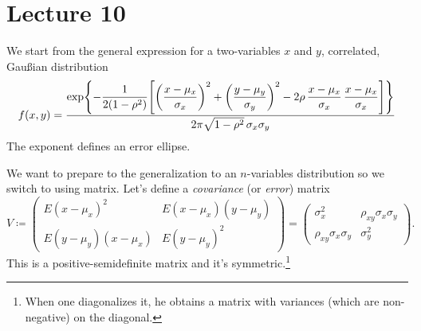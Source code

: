 
\chapter{Lecture 10}

We start from the general expression for a two-variables $x$ and $y$, correlated, Gau\ss{}ian distribution
\begin{equation}
  f(x,y) = \frac{%
	\displaystyle%
	\exp\curlyBrackets*{%
	  -\frac{1}{2(1-\rho^2)}
	  \squareBrackets*{%
		\left(\frac{x-\mu_x}{\sigma_x}\right)^2+
		\left(\frac{y-\mu_y}{\sigma_y}\right)^2
		-2\rho\,\frac{x-\mu_x}{\sigma_x}\,\frac{x-\mu_x}{\sigma_x}
	  }
	}
  }{2\pi\sqrt{1-\rho^2}\,\sigma_x\sigma_y}
\end{equation}
The exponent defines an error ellipse.


We want to prepare to the generalization to an $n$-variables distribution so we switch to using matrix.
Let's define a \emph{covariance} (or \emph{error}) matrix
\begin{equation}
	V\coloneqq 
	\begin{pmatrix}
		E(x-\mu_x)^2	&E(x-\mu_x)(y-\mu_y)\\
		E(y-\mu_y)(x-\mu_x) & E(y-\mu_y)^2
	\end{pmatrix}
	=
	\begin{pmatrix}
		\sigma_x^2	&\rho_{xy}\sigma_x\sigma_y\\
		\rho_{xy}\sigma_x\sigma_y &\sigma_y^2
	\end{pmatrix}.
\end{equation}
This is a positive-semidefinite matrix and it's symmetric.\footnote{When one diagonalizes it, he obtains a matrix with variances (which are non-negative) on the diagonal.}

